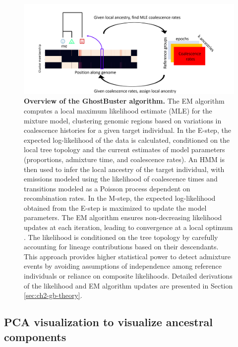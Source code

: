 \begin{figure}[h!]
    \centering
    \includegraphics[scale=0.5]{figures/ghostbuster_method.PNG}
\caption{\textbf{Overview of the GhostBuster algorithm.} The EM algorithm computes a local maximum likelihood estimate (MLE) for the mixture model, clustering genomic regions based on variations in coalescence histories for a given target individual. In the E-step, the expected log-likelihood of the data is calculated, conditioned on the local tree topology and the current estimates of model parameters (proportions, admixture time, and coalescence rates). An HMM is then used to infer the local ancestry of the target individual, with emissions modeled using the likelihood of coalescence times and transitions modeled as a Poisson process dependent on recombination rates. In the M-step, the expected log-likelihood obtained from the E-step is maximized to update the model parameters. The EM algorithm ensures non-decreasing likelihood updates at each iteration, leading to convergence at a local optimum \cite{dempster1977maximum}. The likelihood is conditioned on the tree topology by carefully accounting for lineage contributions based on their descendants. This approach provides higher statistical power to detect admixture events by avoiding assumptions of independence among reference individuals or reliance on composite likelihoods. Detailed derivations of the likelihood and EM algorithm updates are presented in Section \ref{sec:ch2-gb-theory}.}
    \label{fig:gb_overview}
\end{figure}


\subsection{PCA visualization to visualize ancestral components}

